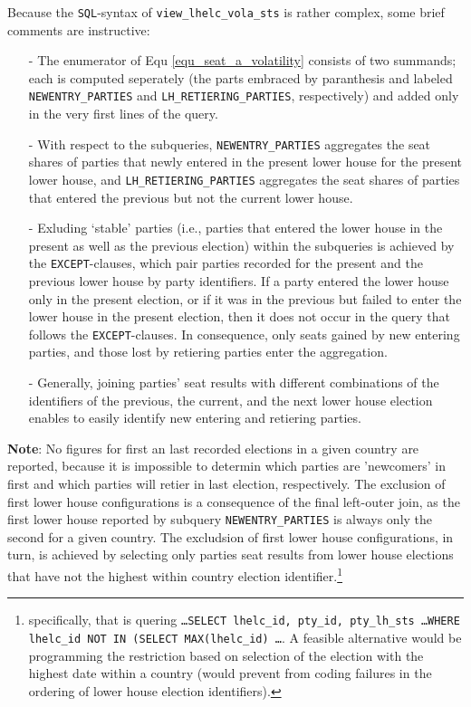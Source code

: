 Because the \texttt{\footnotesize SQL}-syntax of \texttt{\footnotesize view\_lhelc\_vola\_sts} is rather complex, some brief comments are instructive:
\begin{itemize}
\item[-]{The enumerator of Equ \ref{equ_seat_a_volatility} consists of two summands; each is computed seperately (the parts embraced by paranthesis and labeled \texttt{\footnotesize NEWENTRY\_PARTIES} and \texttt{\footnotesize LH\_RETIERING\_PARTIES}, respectively) and added only in the very first lines of the query.}
\item[-]{With respect to the subqueries, 
\texttt{\footnotesize NEWENTRY\_PARTIES} aggregates the seat shares of parties that newly entered in the present lower house for the present lower house, and 
 \texttt{\footnotesize LH\_RETIERING\_PARTIES} aggregates the seat shares of parties that entered the previous but not the current lower house.}
\item[-]{Exluding `stable' parties (i.e., parties that entered the lower house in the present as well as the previous election) within the subqueries is achieved by the \texttt{\footnotesize EXCEPT}-clauses, which pair parties recorded for the present and the previous lower house by party identifiers. If a party entered the lower house only in the present election, or if it was in the previous but failed to enter the lower house in the present election, then it does not occur in the query that follows the \texttt{\footnotesize EXCEPT}-clauses. In consequence, only seats gained by new entering parties, and those lost  by retiering parties     enter the aggregation.}
\item[-]{Generally, joining parties' seat results with different combinations of the identifiers of the previous, the current, and the next lower house election enables to easily identify new entering and retiering parties.}
\end{itemize}

{\bf Note}:	No figures for first an last recorded elections in a given country are reported, because it is impossible to determin which parties are 'newcomers' in first and which parties will retier in last election, respectively. The exclusion of first lower house configurations is a consequence of the final left-outer join, as the first lower house reported by subquery \texttt{\footnotesize NEWENTRY\_PARTIES} 
is always only the second for a given country. 
The excludsion of first lower house configurations, in turn, is achieved by selecting only parties seat results from lower house elections that have not the highest within country election identifier.\footnote{specifically, that is quering \texttt{\smallfont \ldots SELECT lhelc\_id, pty\_id, pty\_lh\_sts \ldots WHERE lhelc\_id NOT IN (SELECT MAX(lhelc\_id) \ldots}. A feasible alternative would be programming the restriction based on selection of the election with the highest date within a country (would prevent from coding failures in the ordering of lower house election identifiers).}



